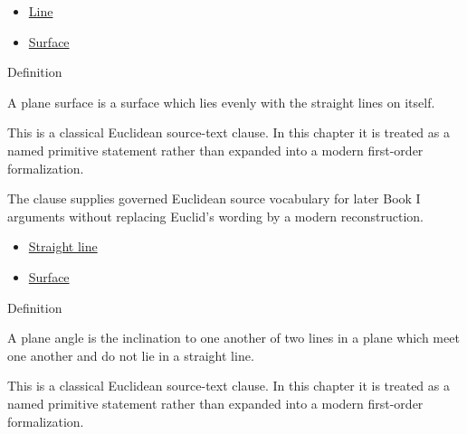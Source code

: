 \begin{lra-not-visible}
\begin{dependencies}
\begin{itemize}
  \item \hyperref[def:euclid-line]{Line}
  \item \hyperref[def:euclid-surface]{Surface}
\end{itemize}
\end{dependencies}
\end{lra-not-visible}

\begin{definitionbox}{Definition}
\begin{definition}
\label{def:euclid-plane-surface}
A plane surface is a surface which lies evenly with the straight lines on itself.
\end{definition}
\end{definitionbox}
\begin{remark*}
This is a classical Euclidean source-text clause. In this chapter it is treated
as a named primitive statement rather than expanded into a modern first-order
formalization.
\end{remark*}

\begin{remark*}[Interpretation]
The clause supplies governed Euclidean source vocabulary for later Book I
arguments without replacing Euclid's wording by a modern reconstruction.
\end{remark*}

\begin{lra-not-visible}
\begin{dependencies}
\begin{itemize}
  \item \hyperref[def:euclid-straight-line]{Straight line}
  \item \hyperref[def:euclid-surface]{Surface}
\end{itemize}
\end{dependencies}
\end{lra-not-visible}

\begin{definitionbox}{Definition}
\begin{definition}
\label{def:euclid-plane-angle}
A plane angle is the inclination to one another of two lines in a plane which
meet one another and do not lie in a straight line.
\end{definition}
\end{definitionbox}
\begin{remark*}
This is a classical Euclidean source-text clause. In this chapter it is treated
as a named primitive statement rather than expanded into a modern first-order
formalization.
\end{remark*}

